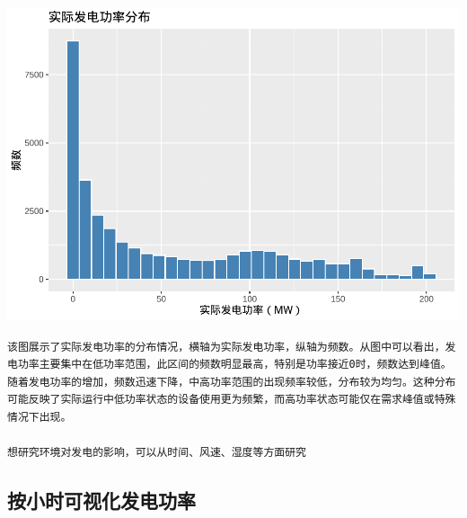 \documentclass[
]{ctexart}
\begin{document}
\includegraphics{1_files/figure-latex/unnamed-chunk-2-1.pdf}

\begin{verbatim}
该图展示了实际发电功率的分布情况，横轴为实际发电功率，纵轴为频数。从图中可以看出，发电功率主要集中在低功率范围，此区间的频数明显最高，特别是功率接近0时，频数达到峰值。
随着发电功率的增加，频数迅速下降，中高功率范围的出现频率较低，分布较为均匀。这种分布可能反映了实际运行中低功率状态的设备使用更为频繁，而高功率状态可能仅在需求峰值或特殊情况下出现。

想研究环境对发电的影响，可以从时间、风速、湿度等方面研究
\end{verbatim}

\subsection{按小时可视化发电功率}\label{ux6309ux5c0fux65f6ux53efux89c6ux5316ux53d1ux7535ux529fux7387}
\end{document}
